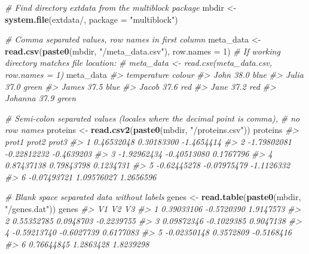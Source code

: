 \documentclass[
]{article}
\newenvironment{Shaded}{\begin{snugshade}}{\end{snugshade}}
\newcommand{\AttributeTok}[1]{\textcolor[rgb]{0.13,0.29,0.53}{#1}}
\newcommand{\CommentTok}[1]{\textcolor[rgb]{0.56,0.35,0.01}{\textit{#1}}}
\newcommand{\DecValTok}[1]{\textcolor[rgb]{0.00,0.00,0.81}{#1}}
\newcommand{\FunctionTok}[1]{\textcolor[rgb]{0.13,0.29,0.53}{\textbf{#1}}}
\newcommand{\NormalTok}[1]{#1}
\newcommand{\OtherTok}[1]{\textcolor[rgb]{0.56,0.35,0.01}{#1}}
\newcommand{\StringTok}[1]{\textcolor[rgb]{0.31,0.60,0.02}{#1}}
\begin{document}
\begin{Shaded}
\begin{Highlighting}[]
\CommentTok{\# Find directory extdata from the multiblock package}
\NormalTok{mbdir }\OtherTok{\textless{}{-}} \FunctionTok{system.file}\NormalTok{(}\StringTok{\textquotesingle{}extdata/\textquotesingle{}}\NormalTok{, }\AttributeTok{package =} \StringTok{"multiblock"}\NormalTok{)}

\CommentTok{\# Comma separated values, row names in first column}
\NormalTok{meta\_data }\OtherTok{\textless{}{-}} \FunctionTok{read.csv}\NormalTok{(}\FunctionTok{paste0}\NormalTok{(mbdir, }\StringTok{"/meta\_data.csv"}\NormalTok{), }\AttributeTok{row.names =} \DecValTok{1}\NormalTok{)}
\CommentTok{\# If working directory matches file location:}
\CommentTok{\# meta\_data \textless{}{-} read.csv(\textquotesingle{}meta\_data.csv\textquotesingle{}, row.names = 1)}
\NormalTok{meta\_data}
\CommentTok{\#\textgreater{}         temperature colour}
\CommentTok{\#\textgreater{} John           38.0   blue}
\CommentTok{\#\textgreater{} Julia          37.0  green}
\CommentTok{\#\textgreater{} James          37.5   blue}
\CommentTok{\#\textgreater{} Jacob          37.6    red}
\CommentTok{\#\textgreater{} Jane           37.2    red}
\CommentTok{\#\textgreater{} Johanna        37.9  green}

\CommentTok{\# Semi{-}colon separated values (locales where the decimal point is comma),}
\CommentTok{\# no row names}
\NormalTok{proteins }\OtherTok{\textless{}{-}} \FunctionTok{read.csv2}\NormalTok{(}\FunctionTok{paste0}\NormalTok{(mbdir, }\StringTok{"/proteins.csv"}\NormalTok{))}
\NormalTok{proteins}
\CommentTok{\#\textgreater{}         prot1       prot2      prot3}
\CommentTok{\#\textgreater{} 1  0.46532048  0.30183300 {-}1.4654414}
\CommentTok{\#\textgreater{} 2 {-}1.79802081 {-}0.22812232 {-}0.4639203}
\CommentTok{\#\textgreater{} 3 {-}1.92962434 {-}0.40513080  0.1767796}
\CommentTok{\#\textgreater{} 4  0.87437138  0.79843798  0.1234731}
\CommentTok{\#\textgreater{} 5 {-}0.62445278 {-}0.07975479 {-}1.1126332}
\CommentTok{\#\textgreater{} 6 {-}0.07493721  1.09576027  1.2656596}

\CommentTok{\# Blank space separated data without labels}
\NormalTok{genes }\OtherTok{\textless{}{-}} \FunctionTok{read.table}\NormalTok{(}\FunctionTok{paste0}\NormalTok{(mbdir, }\StringTok{"/genes.dat"}\NormalTok{))}
\NormalTok{genes}
\CommentTok{\#\textgreater{}            V1         V2         V3}
\CommentTok{\#\textgreater{} 1  0.39033106 {-}0.5720390  1.9147573}
\CommentTok{\#\textgreater{} 2  0.55352785  0.0948703 {-}0.2239755}
\CommentTok{\#\textgreater{} 3  0.09872346 {-}0.1029385  0.9047138}
\CommentTok{\#\textgreater{} 4 {-}0.59213740 {-}0.6027739  0.6177083}
\CommentTok{\#\textgreater{} 5 {-}0.02350148  0.3572809 {-}0.5168416}
\CommentTok{\#\textgreater{} 6  0.76644845  1.2863428  1.8239298}
\end{Highlighting}
\end{Shaded}
\end{document}
